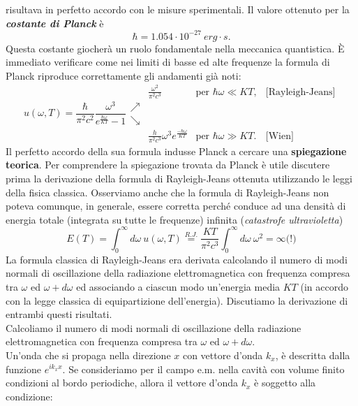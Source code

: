 \documentclass[a4paper,12pt,oneside]{book}
\begin{document}
risultava in perfetto accordo con le misure sperimentali. Il valore ottenuto per la \textbf{\textit{costante di Planck}} è
\[ \hbar = 1.054 \cdot 10^{-27} \ erg\cdot s.\]
Questa costante giocherà un ruolo fondamentale nella meccanica quantistica.
È immediato verificare come nei limiti di basse ed alte frequenze la formula di Planck riproduce correttamente gli andamenti già noti:\\
\begin{equation}
u(\omega , T) =\frac{\hbar}{\pi ^2 c^2} \frac{\omega ^3}{e^{\frac{\hbar \omega}{KT}} -1} 
\begin{array}{clcc}
 & \displaystyle{\frac{\omega ^2}{\pi ^2 c^3} } & \textrm{per } \hbar \omega \ll KT, & \textrm{[Rayleigh-Jeans]}\\
\nearrow \\
\searrow \\
 & \displaystyle{\frac{h}{\pi ^2 c^3}\omega ^3 e^{\frac{-\hbar \omega}{KT}}} & \textrm{per }  \hbar \omega \gg KT .& \textrm{[Wien]}
\end{array}
\end{equation}
Il perfetto accordo della sua formula indusse Planck a cercare una \textbf{spiegazione teorica}. Per comprendere la spiegazione trovata da Planck è utile discutere prima la derivazione della formula di Rayleigh-Jeans ottenuta utilizzando le leggi della fisica classica. Osserviamo anche che la formula di  Rayleigh-Jeans non poteva comunque, in generale, essere corretta perché conduce ad una densità di energia totale (integrata su tutte le frequenze) infinita (\textit{catastrofe ultravioletta})
\begin{equation}
E(T) = \int _0 ^\infty d\omega\ u(\omega , T) \overset{R.J.}{=} \frac{KT}{\pi ^2 c ^3}\int _0 ^\infty d\omega \ \omega ^2 = \infty \textrm{(!)}
\end{equation}
La formula classica di Rayleigh-Jeans era derivata calcolando il numero di modi normali di oscillazione della radiazione elettromagnetica con frequenza compresa tra $\omega$ ed $\omega + d\omega$ ed associando a ciascun modo un'energia media $KT$ (in accordo con la legge classica di equipartizione dell'energia). Discutiamo la derivazione di entrambi questi risultati.\\
Calcoliamo il numero di modi normali di oscillazione della radiazione elettromagnetica con frequenza compresa tra $\omega$ ed $\omega + d\omega$. \\
Un'onda che si propaga nella direzione $x$ con vettore d'onda $k_x$, è descritta dalla funzione $e^{ik_x x}$. Se consideriamo per il campo e.m. nella cavità con volume finito condizioni al bordo periodiche, allora il vettore d'onda $k_x$ è soggetto alla condizione:
\end{document}
